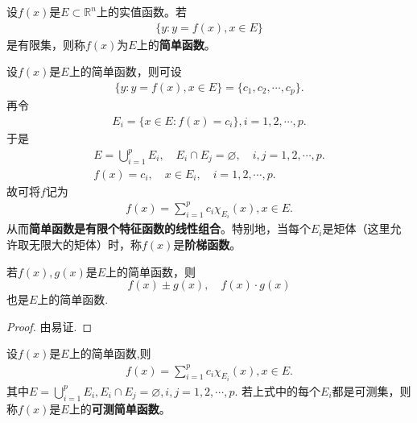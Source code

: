 \documentclass[../../main.tex]{subfiles}
\begin{document}
\begin{definition}[简单函数]
设$f(x)$是$E \subset \mathbb{R}^n$上的实值函数。若
\begin{align*}
\{y: y = f(x), x \in E\}
\end{align*}
是有限集，则称$f(x)$为$E$上的\textbf{简单函数}。
\end{definition}

\begin{theorem}\label{theorem:简单函数是有限个特征函数的线性组合}
设$f(x)$是$E$上的简单函数，则可设
\begin{align*}
\{y:y=f(x),x\in E\}=\{c_1,c_2,\cdots,c_p\}.
\end{align*}
再令
\begin{align*}
E_i=\{x\in E:f(x)=c_i\},i=1,2,\cdots,p.
\end{align*}
于是
\begin{gather*}
E = \bigcup_{i = 1}^{p} E_i, \quad E_i \cap E_j = \varnothing, \quad i, j = 1, 2, \cdots, p. \\
f(x) = c_i, \quad x \in E_i,\quad i = 1, 2, \cdots, p.
\end{gather*}
故可将$f$记为
\begin{align*}
f(x) = \sum_{i = 1}^{p} c_i \chi_{E_i}(x),x \in E.
\end{align*}
从而\textbf{简单函数是有限个特征函数的线性组合}。特别地，当每个$E_i$是矩体（这里允许取无限大的矩体）时，称$f(x)$是\textbf{阶梯函数}。 
\end{theorem}

\begin{proposition}
若$f(x),g(x)$是$E$上的简单函数，则$$f(x) \pm g(x),\quad f(x) \cdot g(x)$$
也是$E$上的简单函数.
\end{proposition}
\begin{proof}
由易证.
\end{proof}

\begin{definition}[可测简单函数]
设$f(x)$是$E$上的简单函数,则
\begin{align*}
f(x)= \sum_{i = 1}^{p} c_i \chi_{E_i}(x),x \in E.
\end{align*}
其中$E = \bigcup_{i = 1}^{p} E_i,  E_i \cap E_j = \varnothing, i, j = 1, 2, \cdots, p.$
若上式中的每个$E_i$都是可测集，则称$f(x)$是$E$上的\textbf{可测简单函数}。
\end{definition}
\end{document}
